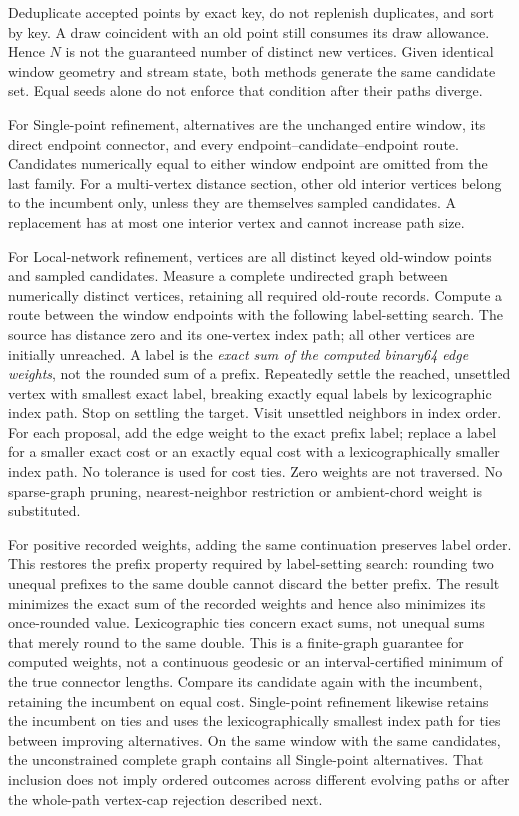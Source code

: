 \documentclass[11pt,letterpaper]{article}
\begin{document}
Deduplicate accepted points by exact key, do not replenish duplicates, and
sort by key. A draw coincident with an old point still consumes its draw
allowance. Hence $N$ is not the guaranteed number of distinct new vertices.
Given identical window geometry and stream state, both methods generate the
same candidate set. Equal seeds alone do not enforce that condition after
their paths diverge.

For Single-point refinement, alternatives are the unchanged entire window,
its direct endpoint connector, and every endpoint--candidate--endpoint route.
Candidates numerically equal to either window endpoint are omitted from the
last family. For a multi-vertex distance section, other old interior vertices
belong to the incumbent only, unless they are themselves sampled candidates.
A replacement has at most one interior vertex and cannot increase path size.

For Local-network refinement, vertices are all distinct keyed old-window
points and sampled candidates. Measure a complete undirected graph between
numerically distinct vertices, retaining all required old-route records.
Compute a route between the window endpoints with the following label-setting
search. The source has distance zero and its one-vertex index path; all other
vertices are initially unreached. A label is the \emph{exact sum of the
computed binary64 edge weights}, not the rounded sum of a prefix.
Repeatedly settle the reached, unsettled vertex with smallest exact label,
breaking exactly equal labels by lexicographic index path. Stop on
settling the target. Visit unsettled neighbors in index order. For each
proposal, add the edge weight to the exact prefix label; replace a label
for a smaller exact cost or an exactly equal cost with a
lexicographically smaller index path. No tolerance is used for cost ties.
Zero weights are not traversed. No sparse-graph pruning, nearest-neighbor
restriction or ambient-chord weight is substituted.

For positive recorded weights, adding the same continuation preserves label
order. This restores the prefix property required by label-setting search:
rounding two unequal prefixes to the same double cannot discard the better
prefix. The result minimizes the exact sum of the recorded weights and hence
also minimizes its once-rounded value. Lexicographic ties concern exact sums,
not unequal sums that merely round to the same double. This is a finite-graph
guarantee for computed weights, not a continuous geodesic or an
interval-certified minimum of the true connector lengths. Compare
its candidate again with the incumbent, retaining the incumbent on equal
cost. Single-point refinement likewise retains the incumbent on ties and
uses the lexicographically smallest index path for ties between improving
alternatives. On the same window with the same candidates, the unconstrained
complete graph contains all Single-point alternatives. That inclusion does
not imply ordered outcomes across different evolving paths or after the
whole-path vertex-cap rejection described next.
\end{document}
